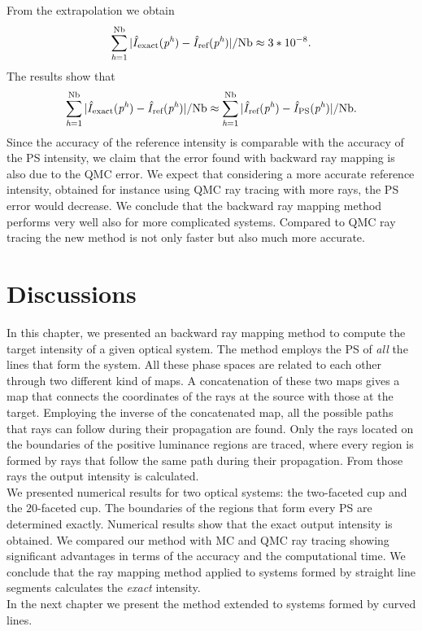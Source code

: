 From the extrapolation we obtain
\begin{equation*}\sum_{\textit{h} = 1}^{\textrm{Nb}}| \hat{I}_{\textrm{exact}}(\textit{p}^{\textit{h}}) - \hat{I}_{\textrm{ref}}(\textit{p}^{\textit{h}})|/\textrm{Nb}\approx 3*10^{-8}. \end{equation*}
The results show that 
\begin{equation*}
\sum_{\textit{h} = 1}^{\textrm{Nb}}| \hat{I}_{\textrm{exact}}(\textit{p}^{\textit{h}}) - \hat{I}_{\textrm{ref}}(\textit{p}^{\textit{h}})|/\textrm{Nb}
\approx \sum_{\textit{h} = 1}^{\textrm{Nb}}|\hat{I}_{\textrm{ref}}(\textit{p}^{\textit{h}}) - \hat{I}_{\textrm{PS}}(\textit{p}^{\textit{h}})|/\textrm{Nb}.
\end{equation*}
Since the accuracy of the reference intensity is comparable with the accuracy of the PS intensity, we claim that the error found with backward ray mapping is also due to the QMC error. We expect that considering a more accurate reference intensity, obtained for instance using QMC ray tracing with more rays, the PS error would decrease.
We conclude that the backward ray mapping method performs very well also for more complicated systems.
Compared to QMC ray tracing the new method is not only faster but also much more accurate.
\section{Discussions}
In this chapter, we presented an backward ray mapping method to compute the target intensity of a given optical system.
The method employs the PS of \textit{all} the lines that form the system.
All these phase spaces are related to each other through two different kind of maps.
A concatenation of these two maps gives a map that connects the coordinates of the rays at the source with those at the target.
Employing the inverse of the concatenated map, all the possible paths that rays can follow during their propagation are found. 
Only the rays located on the boundaries of the positive luminance regions are traced,
where every region is formed by rays that follow the same path during their propagation. From those rays the output intensity is calculated. \\ \indent
We presented numerical results for two optical systems: the two-faceted cup and the $20$-faceted cup. The boundaries of the regions that form every PS are determined exactly.
 Numerical results show that the exact output intensity is obtained.
 We compared our method with MC and QMC ray tracing showing significant advantages in terms of the accuracy and the computational time.
 We conclude that the ray mapping method applied to systems formed by straight line segments calculates the \textit{exact} intensity.\\
\indent In the next chapter we present the method extended to systems formed by curved lines. 


